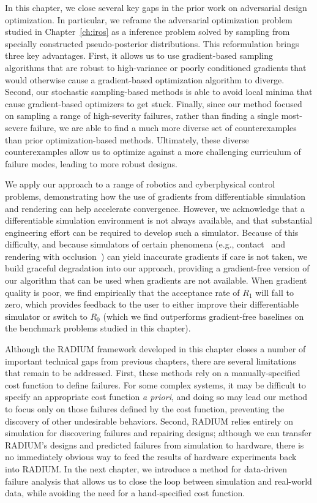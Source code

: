 In this chapter, we close several key gaps in the prior work on adversarial design optimization. In particular, we reframe the adversarial optimization problem studied in Chapter~\ref{ch:iros} as a inference problem solved by sampling from specially constructed pseudo-posterior distributions. This reformulation brings three key advantages. First, it allows us to use gradient-based sampling algorithms that are robust to high-variance or poorly conditioned gradients that would otherwise cause a gradient-based optimization algorithm to diverge. Second, our stochastic sampling-based methods is able to avoid local minima that cause gradient-based optimizers to get stuck. Finally, since our method focused on sampling a range of high-severity failures, rather than finding a single most-severe failure, we are able to find a much more diverse set of counterexamples than prior optimization-based methods. Ultimately, these diverse counterexamples allow us to optimize against a more challenging curriculum of failure modes, leading to more robust designs.

We apply our approach to a range of robotics and cyberphysical control problems, demonstrating how the use of gradients from differentiable simulation and rendering can help accelerate convergence. However, we acknowledge that a differentiable simulation environment is not always available, and that substantial engineering effort can be required to develop such a simulator. Because of this difficulty, and because simulators of certain phenomena (e.g., contact~\cite{huDiffTaichiDifferentiableProgramming2019} and rendering with occlusion~\cite{zhaoPhysicsbasedDifferentiableRendering2020}) can yield inaccurate gradients if care is not taken, we build graceful degradation into our approach, providing a gradient-free version of our algorithm that can be used when gradients are not available. When gradient quality is poor, we find empirically that the acceptance rate of $R_1$ will fall to zero, which provides feedback to the user to either improve their differentiable simulator or switch to $R_0$ (which we find outperforms gradient-free baselines on the benchmark problems studied in this chapter).

Although the RADIUM framework developed in this chapter closes a number of important technical gaps from previous chapters, there are several limitations that remain to be addressed. First, these methods rely on a manually-specified cost function to define failures. For some complex systems, it may be difficult to specify an appropriate cost function \textit{a priori}, and doing so may lead our method to focus only on those failures defined by the cost function, preventing the discovery of other undesirable behaviors. Second, RADIUM relies entirely on simulation for discovering failures and repairing designs; although we can transfer RADIUM's designs and predicted failures from simulation to hardware, there is no immediately obvious way to feed the results of hardware experiments back into RADIUM. In the next chapter, we introduce a method for data-driven failure analysis that allows us to close the loop between simulation and real-world data, while avoiding the need for a hand-specified cost function.
